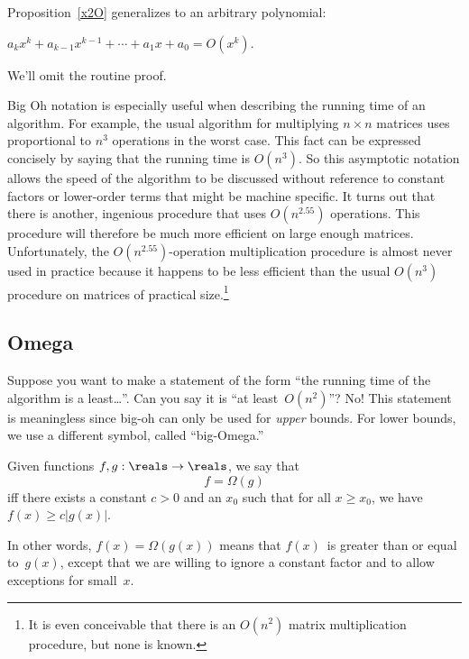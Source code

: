 Proposition~\ref{x2O} generalizes to an arbitrary polynomial:
\begin{proposition}
    $a_k x^k + a_{k-1} x^{k-1} + \cdots + a_1x + a_0 = O(x^k)$.
\end{proposition}
We'll omit the routine proof.

Big Oh notation is especially useful when describing the running time
of an algorithm.  For example, the usual algorithm for multiplying $n
\times n$ matrices uses proportional to $n^3$ operations in the worst case.  This
fact can be expressed concisely by saying that the running time is
$O(n^3)$.  So this asymptotic notation allows the speed of the
algorithm to be discussed without reference to constant factors or
lower-order terms that might be machine specific.  It turns out that
there is another, ingenious  procedure that
uses $O(n^{2.55})$ operations.  This procedure will therefore be much
more efficient on large enough matrices.  Unfortunately, the
$O(n^{2.55})$-operation multiplication procedure is almost never used
in practice because it happens to be less efficient than the usual
$O(n^3)$ procedure on matrices of practical size.\footnote{It is even
  conceivable that there is an $O(n^2)$ matrix multiplication
  procedure, but none is known.}

\subsection{Omega}

Suppose you want to make a statement of the form ``the running time of
the algorithm is a least\dots''.  Can you say it is ``at
least~$O(n^2)$''?  No!  This statement is meaningless since big-oh can
only be used for \emph{upper} bounds.  For lower bounds, we use a
different symbol, called ``big-Omega.''

\begin{definition}\label{def:Omega}
Given functions $f, g : \reals \to \reals$, we say that
\begin{equation*}
    f = \Omega(g)
\end{equation*}
iff there exists a constant $c > 0$ and an $x_0$ such that for all $x
\ge x_0$, we have $f(x) \ge c |g(x)|$.
\end{definition}

In other words, $f(x) = \Omega(g(x))$ means that $f(x)$~is greater
than or equal to~$g(x)$, except that we are willing to ignore a
constant factor and to allow exceptions for small~$x$.

